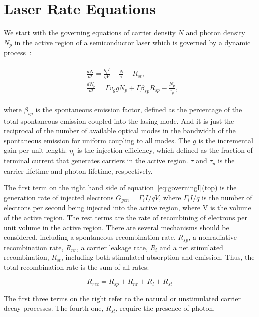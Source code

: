 \section{Laser Rate Equations} \label{LaserRateEq}

We start with the governing equations of carrier density $N$ and photon density
$N_p$ in the active region of a semiconductor laser which is governed by a
dynamic process~\cite{coldren2012diode}:

\begin{eqnarray}
\begin{aligned}
  & \frac{dN}{dt} = \frac{\eta_{i}I}{qV} - \frac{N}{\tau} - R_{st},
  \\
  & \frac{dN_p}{dt} = {\Gamma}v_g{g}N_p + \Gamma\beta_{sp}R_{sp} - \frac{N_p}{\tau_p},
\end{aligned}
\label{eq:governingI}
\end{eqnarray}

where $\beta_{sp}$ is the spontaneous emission factor, defined as the
percentage of the total spontaneous emission coupled into the lasing mode. And
it is just the reciprocal of the number of available optical modes in the
bandwidth of the spontaneous emission for uniform coupling to all modes. The
$g$ is the incremental gain per unit length. $\eta_i$ is the injection
efficiency, which defined as the fraction of terminal current that generates
carriers in the active region. $\tau$ and $\tau_p$ is the carrier lifetime and
photon lifetime, respectively.

The first term on the right hand side of equation~\ref{eq:governingI}(top) is
the generation rate of injected electrons $G_{gen} = {\Gamma_{i}I}/{qV}$, where
${\Gamma_{i}I}/{q}$ is the number of electrons per second being injected into
the active region, where V is the volume of the active region. The rest terms
are the rate of recombining of electrons per unit volume in the active region.
There are several mechanisms should be considered, including a spontaneous
recombination rate, $R_{sp}$, a nonradiative recombination rate, $R_{nr}$, a
carrier leakage rate, $R_l$ and a net stimulated recombination, $R_{st}$,
including both stimulated absorption and emission. Thus, the total
recombination rate is the sum of all rates:

\begin{equation}
  R_{rec} = R_{sp} + R_{nr} + R_{l} + R_{st}
  \label{eq:recrate}
\end{equation}

The first three terms on the right refer to the natural or unstimulated carrier
decay processes. The fourth one, $R_{st}$, require the presence of photon.

